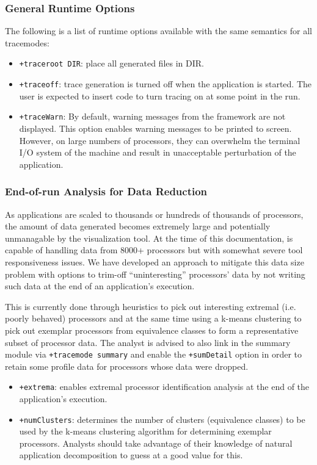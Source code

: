 \subsubsection{General Runtime Options}
\label{sec::general options}

The following is a list of runtime options available with the same
semantics for all tracemodes:

\begin{itemize}
\item
{\tt +traceroot DIR}: place all generated files in DIR.
\item
{\tt +traceoff}: trace generation is turned off when the application
is started. The user is expected to insert code to turn tracing on at
some point in the run.
\item
{\tt +traceWarn}: By default, warning messages from the framework are
not displayed. This option enables warning messages to be printed to
screen. However, on large numbers of processors, they can overwhelm
the terminal I/O system of the machine and result in unacceptable
perturbation of the application.
\end{itemize}

\subsubsection{End-of-run Analysis for Data Reduction}
\label{sec::data reduction}

As applications are scaled to thousands or hundreds of thousands of
processors, the amount of data generated becomes extremely large and
potentially unmanagable by the visualization tool. At the time of this
documentation, \projections{} is capable of handling data from 8000+
processors but with somewhat severe tool responsiveness issues. We
have developed an approach to mitigate this data size problem with
options to trim-off ``uninteresting'' processors' data by not writing
such data at the end of an application's execution.

This is currently done through heuristics to pick out interesting
extremal (i.e. poorly behaved) processors and at the same time using a
k-means clustering to pick out exemplar processors from equivalence
classes to form a representative subset of processor data. The analyst
is advised to also link in the summary module via {\tt +tracemode
summary} and enable the {\tt +sumDetail} option in order to retain
some profile data for processors whose data were dropped.

\begin{itemize}
\item
{\tt +extrema}: enables extremal processor identification analysis at
the end of the application's execution.
\item
{\tt +numClusters}: determines the number of clusters (equivalence
classes) to be used by the k-means clustering algorithm for
determining exemplar processors. Analysts should take advantage of
their knowledge of natural application decomposition to guess at a
good value for this.
\end{itemize}

